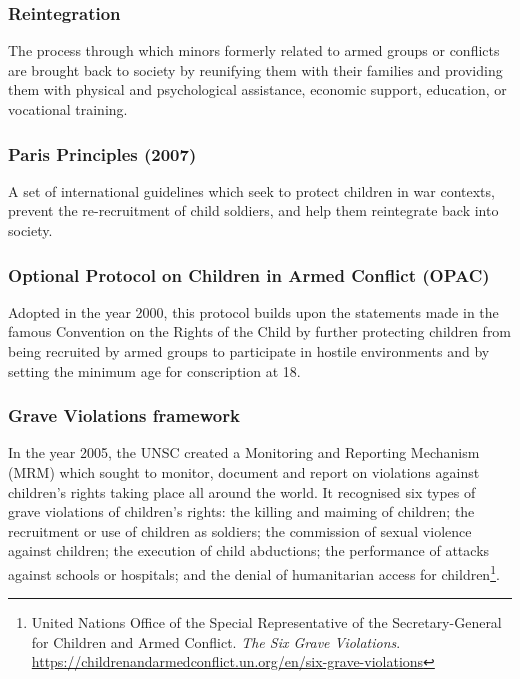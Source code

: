 \subsubsection{Reintegration}

The process through which minors formerly related to armed groups or conflicts are brought back to society by reunifying them with their families and providing them with physical and psychological assistance, economic support, education, or vocational training.

\subsubsection{Paris Principles (2007)}

A set of international guidelines which seek to protect children in war contexts, prevent the re-recruitment of child soldiers, and help them reintegrate back into society.

\subsubsection{Optional Protocol on Children in Armed Conflict (OPAC)}

Adopted in the year 2000, this protocol builds upon the statements made in the famous Convention on the Rights of the Child by further protecting children from being recruited by armed groups to participate in hostile environments and by setting the minimum age for conscription at 18.

\subsubsection{Grave Violations framework}

In the year 2005, the UNSC created a Monitoring and Reporting Mechanism (MRM) which sought to monitor, document and report on violations against children’s rights taking place all around the world. It recognised six types of grave violations of children’s rights: the killing and maiming of children; the recruitment or use of children as soldiers; the commission of sexual violence against children; the execution of child abductions; the performance of attacks against schools or hospitals; and the denial of humanitarian access for children\footnote{United Nations Office of the Special Representative of the Secretary-General for Children and Armed Conflict. \emph{The Six Grave Violations}. \url{https://childrenandarmedconflict.un.org/en/six-grave-violations}}.

